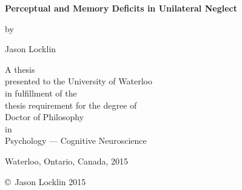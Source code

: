 

\pagestyle{empty}

\begin{titlepage}
        \begin{center}
        \vspace*{1.0cm}

        \Huge
        {\bf Perceptual and Memory Deficits in Unilateral Neglect }

        \vspace*{1.0cm}

        \normalsize
        by \\

        \vspace*{1.0cm}

        \Large
        Jason Locklin \\

        \vspace*{3.0cm}

        \normalsize
        A thesis \\
        presented to the University of Waterloo \\ 
        in fulfillment of the \\
        thesis requirement for the degree of \\
	Doctor of Philosophy\\
        in \\
        Psychology --- Cognitive Neuroscience\\

        \vspace*{2.0cm}

        Waterloo, Ontario, Canada, 2015 \\

        \vspace*{1.0cm}

        \copyright\ Jason Locklin 2015 \\
        \end{center}
\end{titlepage}

\doublespacing
\pagestyle{plain}
\setcounter{page}{2}

